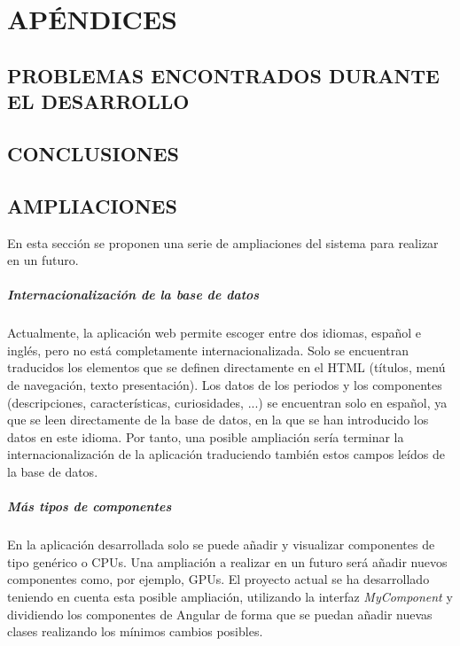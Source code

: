 \newpage
\chapter{APÉNDICES}
\newpage

\section{PROBLEMAS ENCONTRADOS DURANTE EL DESARROLLO}



\newpage
\section{CONCLUSIONES}



\newpage
\section{AMPLIACIONES} 
En esta sección se proponen una serie de ampliaciones del sistema para realizar en un futuro.
\paragraph*{Internacionalización de la base de datos}
Actualmente, la aplicación web permite escoger entre dos idiomas, español e inglés, pero no está completamente internacionalizada. Solo se encuentran traducidos los elementos que se definen directamente en el HTML (títulos, menú de navegación, texto presentación). Los datos de los periodos y los componentes (descripciones, características, curiosidades, ...) se encuentran solo en español, ya que se leen directamente de la base de datos, en la que se han introducido los datos en este idioma. Por tanto, una posible ampliación sería terminar la internacionalización de la aplicación traduciendo también estos campos leídos de la base de datos.

\paragraph*{Más tipos de componentes}
En la aplicación desarrollada solo se puede añadir y visualizar componentes de tipo genérico o CPUs. Una ampliación a realizar en un futuro será añadir nuevos componentes como, por ejemplo, GPUs. El proyecto actual se ha desarrollado teniendo en cuenta esta posible ampliación, utilizando la interfaz \textit{MyComponent} y dividiendo los componentes de Angular de forma que se puedan añadir nuevas clases realizando los mínimos cambios posibles.

